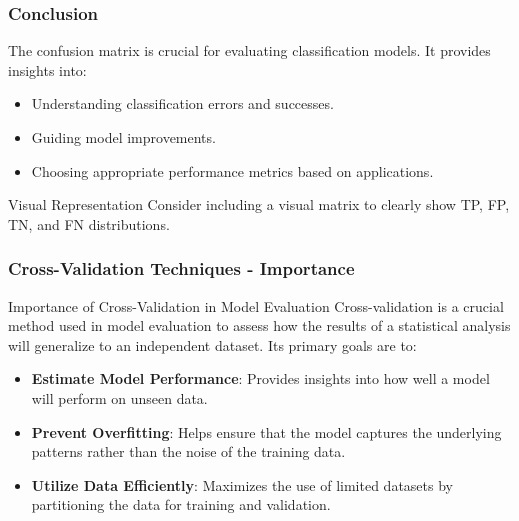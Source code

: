 \documentclass{beamer}
\begin{document}
\begin{frame}[fragile]
    \frametitle{Conclusion}
    The confusion matrix is crucial for evaluating classification models. It provides insights into:
    \begin{itemize}
        \item Understanding classification errors and successes.
        \item Guiding model improvements.
        \item Choosing appropriate performance metrics based on applications.
    \end{itemize}

    \begin{block}{Visual Representation}
        Consider including a visual matrix to clearly show TP, FP, TN, and FN distributions.
    \end{block}
\end{frame}

\begin{frame}[fragile]
    \frametitle{Cross-Validation Techniques - Importance}
    \begin{block}{Importance of Cross-Validation in Model Evaluation}
        Cross-validation is a crucial method used in model evaluation to assess how the results of a statistical analysis will generalize to an independent dataset. Its primary goals are to:
    \end{block}
    \begin{itemize}
        \item \textbf{Estimate Model Performance}: Provides insights into how well a model will perform on unseen data.
        \item \textbf{Prevent Overfitting}: Helps ensure that the model captures the underlying patterns rather than the noise of the training data.
        \item \textbf{Utilize Data Efficiently}: Maximizes the use of limited datasets by partitioning the data for training and validation.
    \end{itemize}
\end{frame}
\end{document}
